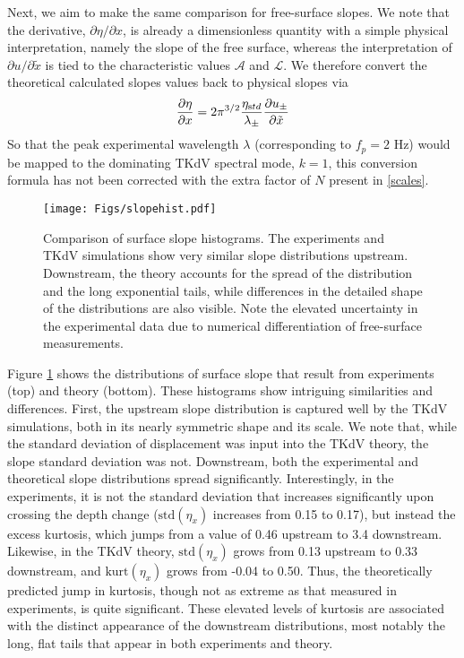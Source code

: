 \documentclass[11pt]{article}
\newcommand{\pd}[2]    { \frac{\partial #1} {\partial #2} }
\newcommand{\freqp}{f_p}
\newcommand{\etastd}{\eta_{\text std}}
\newcommand{\lam}{\lambda}
\newcommand{\lamupdn}{\lam_{\pm}}
\newcommand{\lamfac}{N}
\newcommand{\kurt}{\text{kurt}}
\newcommand{\std}{\text{std}}
\newcommand{\ampscale}{\mathcal{A}}
\newcommand{\lengthscale}{\mathcal{L}}
\newcommand{\uupdn}{u_{\pm}}
\begin{document}
	Next, we aim to make the same comparison for free-surface slopes. We note that the derivative, $\partial \eta / \partial x$, is already a dimensionless quantity with a simple physical interpretation, namely the slope of the free surface, whereas the interpretation of $\partial u/\partial \tilde{x}$ is tied to the characteristic values $\ampscale$ and $\lengthscale$.  
We therefore convert the theoretical calculated slopes values back to physical slopes via
\begin{equation}
\pd{\eta}{x} = 2 \pi^{3/2} \frac{\etastd}{\lamupdn} \pd{\uupdn}{\tilde{x}}
\end{equation}
So that the peak experimental wavelength $\lam$ (corresponding to $\freqp = 2$ Hz) would be mapped to the dominating TKdV spectral mode, $k = 1$,  this conversion formula has not been corrected with the extra factor of $\lamfac$ present in \eqref{scales}.
 
\begin{figure}%
\begin{center}
\texttt{[image: Figs/slopehist.pdf]}
\caption{
Comparison of surface slope histograms. The experiments and TKdV simulations show very similar slope distributions upstream. Downstream, the theory accounts for the spread of the distribution and the long exponential tails, while differences in the detailed shape of the distributions are also visible. Note the elevated uncertainty in the experimental data due to numerical differentiation of free-surface measurements.}
\label{slopehist}
\end{center}
\end{figure}
 
	Figure \ref{slopehist} shows the distributions of surface slope that result from experiments (top) and theory (bottom). These histograms show intriguing similarities and differences. First, the upstream slope distribution is captured well by the TKdV simulations, both in its nearly symmetric shape and its scale. We note that, while the standard deviation of displacement was input into the TKdV theory, the slope standard deviation was not. Downstream, both the experimental and theoretical slope distributions  spread significantly. Interestingly, in the experiments, it is not the standard deviation that increases significantly upon crossing the depth change ($\std(\eta_x)$ increases from 0.15 to 0.17), but instead the excess kurtosis, which jumps from a value of 0.46 upstream to 3.4 downstream. Likewise, in the TKdV theory, $\std(\eta_x)$ grows from 0.13 upstream to 0.33 downstream, and $\kurt(\eta_x)$ grows from -0.04 to 0.50. Thus, the theoretically predicted jump in kurtosis, though not as extreme as that measured in experiments, is quite significant. These elevated levels of kurtosis are associated with the distinct appearance of the downstream distributions, most notably the long, flat tails that appear in both experiments and theory.
 		
\end{document}
